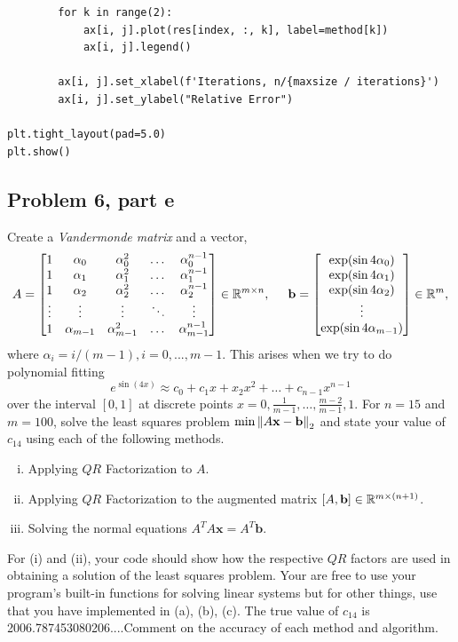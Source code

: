 \begin{solution}
\begin{lstlisting}
        for k in range(2):
            ax[i, j].plot(res[index, :, k], label=method[k])
            ax[i, j].legend()
            
        ax[i, j].set_xlabel(f'Iterations, n/{maxsize / iterations}')
        ax[i, j].set_ylabel("Relative Error")

plt.tight_layout(pad=5.0)
plt.show()
\end{lstlisting}
\end{solution}

\subsection{Problem 6, part e}
Create a \textit{Vandermonde matrix} and a vector,
\[
A = \mqty[
    1 &\alpha_0 &\alpha_0^2 &\dots &\alpha_0^{n-1} \\
    1 &\alpha_1 &\alpha_1^2 &\dots &\alpha_1^{n-1} \\
    1 &\alpha_2 &\alpha_2^2 &\dots &\alpha_2^{n-1} \\
    \vdots &\vdots &\vdots &\ddots &\vdots\\
    1 &\alpha_{m - 1} &\alpha_{m - 1}^2 &\dots &\alpha_{m - 1}^{n-1} 
        ]
        \in \R^{m\times n}, 
        \hspace{5mm}
        \textbf{b} = 
        \mqty[
        \exp (\sin 4\alpha_0)\\
        \exp (\sin 4\alpha_1)\\
        \exp (\sin 4\alpha_2)\\
        \vdots \\
        \exp (\sin 4\alpha_{m - 1})
        ] \in \R^m,
\]
where $\alpha_i = i/(m-1), i = 0, ..., m-1$. This arises when we try to do polynomial fitting
\[
e^{\sin(4x)} \approx c_0 + c_1x + x_2x^2 + \dots + c_{n-1}x^{n-1}
\]
over the interval $[0, 1]$ at discrete points $x = 0, \frac{1}{m-1}, \dots, \frac{m - 2}{m - 1}, 1$. For $n = 15$ and $m = 100$, solve the least squares problem $\min \norm{A\textbf{x} - \textbf{b}}_2$ and state your value of $c_{14}$ using each of the following methods.
\begin{enumerate}[(i)]
    \item Applying $QR$ Factorization to $A$.
    \item Applying $QR$ Factorization to the augmented matrix $[A, \textbf{b}] \in \mathbb{R}^{m \times (n+1)}$.
    \item Solving the normal equations $A^TA\textbf{x} = A^T\textbf{b}.$
\end{enumerate}
For (i) and (ii), your code should show how the respective $QR$ factors are used in obtaining a solution of the least squares problem. Your are free to use your program's built-in functions for solving linear systems but for other things, use that you have implemented in (a), (b), (c). The true value of $c_{14}$ is 2006.787453080206....Comment on the accuracy of each method and algorithm.
